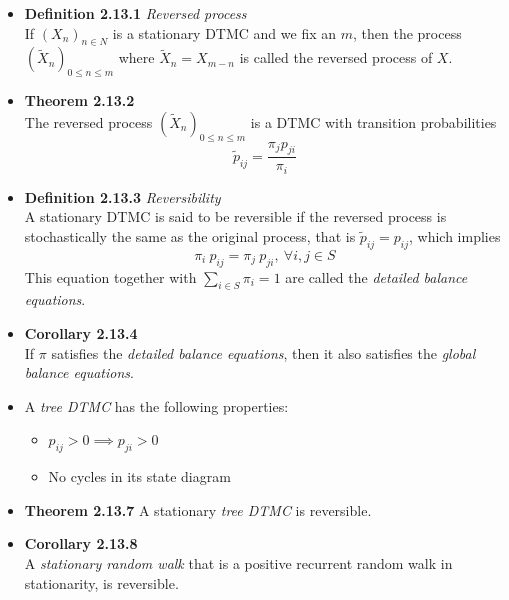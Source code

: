 \documentclass[11pt,a4paper]{article}
\begin{document}
\begin{itemize}

    \item \textbf{Definition 2.13.1} \emph{Reversed process} \\
        If ${(X_n)}_{n \in N}$ is a stationary DTMC and we fix an $m$, then the process
        ${(\widetilde{X}_n)}_{0 \leq n \leq m}$ where $\widetilde{X}_n = X_{m-n}$
        is called the reversed process of $X$.

    \item \textbf{Theorem 2.13.2} \\
        The reversed process ${(\widetilde{X}_n)}_{0 \leq n \leq m}$
        is a DTMC with transition probabilities
        \[
            \widetilde{p}_{ij} = \frac{ {\pi_j} {p_{ji}} }{\pi_i}
        \]

    \item \textbf{Definition 2.13.3} \emph{Reversibility} \\
        A stationary DTMC is said to be reversible if the reversed process is stochastically the
        same as the original process,
        that is $\widetilde{p}_{ij} = p_{ij}$, which implies
        \[
            \pi_i \ p_{ij} = \pi_j \ p_{ji}, \ \forall i, j \in S
        \]
        This equation together with $\sum_{i \in S} \pi_i = 1$
        are called the \emph{detailed balance equations}.

    \item \textbf{Corollary 2.13.4} \\
        If $\pi$ satisfies the \emph{detailed balance equations}, then it also satisfies the
        \emph{global balance equations}.

    \item A \emph{tree DTMC} has the following properties:
        \begin{itemize}
            \item $p_{ij} > 0 \implies p_{ji} > 0$
            \item No cycles in its state diagram
        \end{itemize}

    \item \textbf{Theorem 2.13.7} A stationary \emph{tree DTMC} is reversible.

    \item \textbf{Corollary 2.13.8} \\
        A \emph{stationary random walk} that is a positive recurrent random walk in stationarity,
        is reversible.

\end{itemize}
\end{document}
